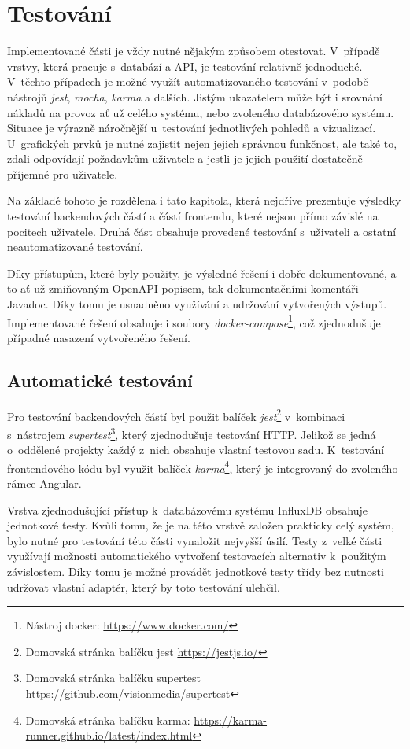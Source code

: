 \chapter{Testování}
Implementované části je vždy nutné nějakým způsobem otestovat. V~případě vrstvy, která pracuje s~databází a API, je testování relativně jednoduché. V~těchto případech je možné využít automatizovaného testování v~podobě nástrojů \textit{jest}, \textit{mocha}, \textit{karma} a dalších. Jistým ukazatelem může být i srovnání nákladů na provoz ať už celého systému, nebo zvoleného databázového systému. Situace je výrazně náročnější u~testování jednotlivých pohledů a vizualizací. U~grafických prvků je nutné zajistit nejen jejich správnou funkčnost, ale také to, zdali odpovídají požadavkům uživatele a jestli je jejich použití dostatečně příjemné pro uživatele.

Na základě tohoto je rozdělena i tato kapitola, která nejdříve prezentuje výsledky testování backendových částí a částí frontendu, které nejsou přímo závislé na pocitech uživatele. Druhá část obsahuje provedené testování s~uživateli a ostatní neautomatizované testování.

Díky přístupům, které byly použity, je výsledné řešení i dobře dokumentované, a to ať už zmiňovaným OpenAPI popisem, tak dokumentačními komentáři Javadoc. Díky tomu je usnadněno využívání a udržování vytvořených výstupů. Implementované řešení obsahuje i soubory \textit{docker-compose}\footnote{Nástroj docker: \url{https://www.docker.com/}}, což zjednodušuje případné nasazení vytvořeného řešení.

\section{Automatické testování}
Pro testování backendových částí byl použit balíček \emph{jest}\footnote{Domovská stránka balíčku jest \url{https://jestjs.io/}} v~kombinaci s~nástrojem \textit{supertest}\footnote{Domovská stránka balíčku supertest \url{https://github.com/visionmedia/supertest}}, který zjednodušuje testování HTTP. Jelikož se jedná o~oddělené projekty každý z~nich obsahuje vlastní testovou sadu. K~testování frontendového kódu byl využit balíček \textit{karma}\footnote{Domovská stránka balíčku karma: \url{https://karma-runner.github.io/latest/index.html}}, který je integrovaný do zvoleného rámce Angular.

Vrstva zjednodušující přístup k~databázovému systému InfluxDB obsahuje jednotkové testy. Kvůli tomu, že je na této vrstvě založen prakticky celý systém, bylo nutné pro testování této části vynaložit nejvyšší úsilí. Testy z~velké části využívají možnosti automatického vytvoření testovacích alternativ k~použitým závislostem. Díky tomu je možné provádět jednotkové testy třídy bez nutnosti udržovat vlastní adaptér, který by toto testování ulehčil.

